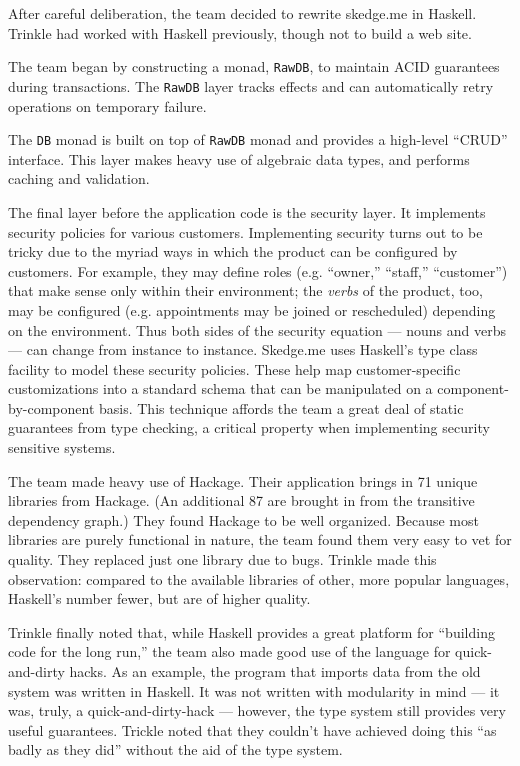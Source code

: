 \documentclass{jfp1}
\begin{document}
After careful deliberation, the team decided to rewrite skedge.me in 
Haskell. Trinkle had worked with Haskell previously, though not
to build a web site.

The team began by constructing a monad, \texttt{RawDB}, to maintain
ACID guarantees during transactions. The \texttt{RawDB} layer tracks
effects and can automatically retry operations on temporary failure.

The \texttt{DB} monad is built on top of \texttt{RawDB} monad and 
provides a high-level ``CRUD'' interface. This layer makes heavy 
use of algebraic data types, and performs caching and validation.

The final layer before the application code is the security layer. It
implements security policies for various customers. Implementing
security turns out to be tricky due to the myriad ways in which the
product can be configured by customers. For example, they may define
roles (e.g. ``owner,'' ``staff,'' ``customer'') that make sense only
within their environment; the \textit{verbs} of the product, too, may
be configured (e.g. appointments may be joined or rescheduled)
depending on the environment. Thus both sides of the security equation
--- nouns and verbs --- can change from instance to instance.
Skedge.me uses Haskell's type class facility to model these security
policies. These help map customer-specific customizations into a
standard schema that can be manipulated on a component-by-component
basis. This technique affords the team a great deal of static
guarantees from type checking, a critical property when implementing
security sensitive systems.

The team made heavy use of Hackage. Their application brings in 
71 unique libraries from Hackage. (An additional 87 are brought in
from the transitive dependency graph.) They found Hackage to be 
well organized. Because most libraries are purely functional in nature,
the team found them very easy to vet for quality. They replaced just
one library due to bugs. Trinkle made this observation: compared to 
the available libraries of other, more popular languages, Haskell's 
number fewer, but are of higher quality.

Trinkle finally noted that, while Haskell provides a great platform
for ``building code for the long run,'' the team also made good use of
the language for quick-and-dirty hacks. As an example, the program
that imports data from the old system was written in Haskell. It was
not written with modularity in mind --- it was, truly, a
quick-and-dirty-hack --- however, the type system still provides very
useful guarantees. Trickle noted that they couldn't have achieved
doing this ``as badly as they did'' without the aid of the type
system.
\end{document}
